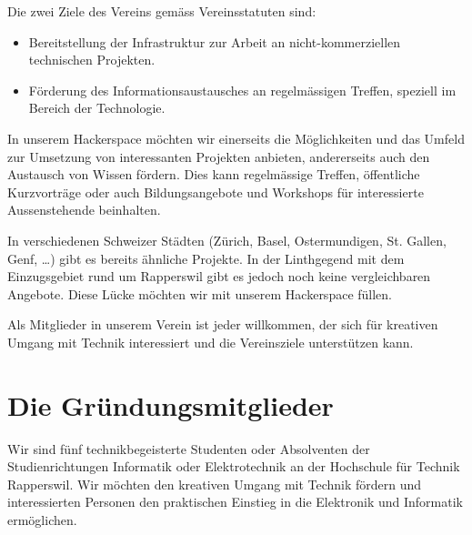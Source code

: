 \documentclass[10pt,a4paper,parskip,fleqn]{scrartcl}
\begin{document}
Die zwei Ziele des Vereins gemäss Vereinsstatuten sind:

\begin{itemize}
		\item Bereitstellung der Infrastruktur zur Arbeit an nicht-kommerziellen
			technischen Projekten.
		\item Förderung des Informationsaustausches an regelmässigen Treffen,
			speziell im Bereich der Technologie.
\end{itemize}

In unserem Hackerspace möchten wir einerseits die Möglichkeiten und das Umfeld
zur Umsetzung von interessanten Projekten anbieten, andererseits auch den
Austausch von Wissen fördern. Dies kann regelmässige Treffen, öffentliche
Kurzvorträge oder auch Bildungsangebote und Workshops für interessierte
Aussenstehende beinhalten.

In verschiedenen Schweizer Städten (Zürich, Basel, Ostermundigen, St.  Gallen,
Genf, \ldots) gibt es bereits ähnliche Projekte. In der Linthgegend mit dem
Einzugsgebiet rund um Rapperswil gibt es jedoch noch keine vergleichbaren
Angebote. Diese Lücke möchten wir mit unserem Hackerspace füllen.

Als Mitglieder in unserem Verein ist jeder willkommen, der sich für kreativen
Umgang mit Technik interessiert und die Vereinsziele unterstützen kann.


\section{Die Gründungsmitglieder}

Wir sind fünf technikbegeisterte Studenten oder Absolventen der
Studienrichtungen Informatik oder Elektrotechnik an der Hochschule für Technik
Rapperswil. Wir möchten den kreativen Umgang mit Technik fördern und
interessierten Personen den praktischen Einstieg in die Elektronik und
Informatik ermöglichen.

\end{document}
